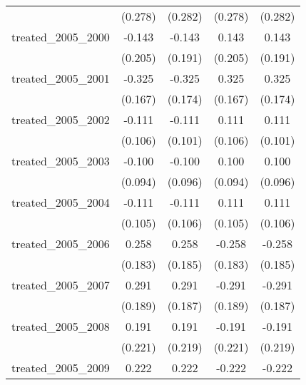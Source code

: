{\begin{tabular}{l*{4}{c}}
            &     (0.278)         &     (0.282)         &     (0.278)         &     (0.282)         \\
[1em]
treated\_2005\_2000&      -0.143         &      -0.143         &       0.143         &       0.143         \\
            &     (0.205)         &     (0.191)         &     (0.205)         &     (0.191)         \\
[1em]
treated\_2005\_2001&      -0.325         &      -0.325         &       0.325         &       0.325         \\
            &     (0.167)         &     (0.174)         &     (0.167)         &     (0.174)         \\
[1em]
treated\_2005\_2002&      -0.111         &      -0.111         &       0.111         &       0.111         \\
            &     (0.106)         &     (0.101)         &     (0.106)         &     (0.101)         \\
[1em]
treated\_2005\_2003&      -0.100         &      -0.100         &       0.100         &       0.100         \\
            &     (0.094)         &     (0.096)         &     (0.094)         &     (0.096)         \\
[1em]
treated\_2005\_2004&      -0.111         &      -0.111         &       0.111         &       0.111         \\
            &     (0.105)         &     (0.106)         &     (0.105)         &     (0.106)         \\
[1em]
treated\_2005\_2006&       0.258         &       0.258         &      -0.258         &      -0.258         \\
            &     (0.183)         &     (0.185)         &     (0.183)         &     (0.185)         \\
[1em]
treated\_2005\_2007&       0.291         &       0.291         &      -0.291         &      -0.291         \\
            &     (0.189)         &     (0.187)         &     (0.189)         &     (0.187)         \\
[1em]
treated\_2005\_2008&       0.191         &       0.191         &      -0.191         &      -0.191         \\
            &     (0.221)         &     (0.219)         &     (0.221)         &     (0.219)         \\
[1em]
treated\_2005\_2009&       0.222         &       0.222         &      -0.222         &      -0.222         \\

\end{tabular}}
